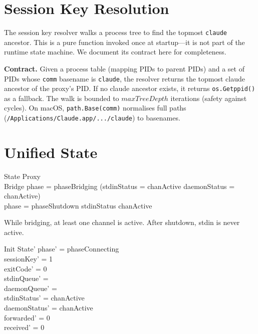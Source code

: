 \documentclass[a4paper,10pt,fleqn]{article}
\begin{document}
\section{Session Key Resolution}

The session key resolver walks a process tree to find the topmost
\texttt{claude} ancestor.  This is a pure function invoked once at
startup---it is not part of the runtime state machine.  We document
its contract here for completeness.

\textbf{Contract.}  Given a process table (mapping PIDs to parent
PIDs) and a set of PIDs whose \texttt{comm} basename is
\texttt{claude}, the resolver returns the topmost claude ancestor
of the proxy's PID.  If no claude ancestor exists, it returns
\texttt{os.Getppid()} as a fallback.  The walk is bounded to
$maxTreeDepth$ iterations (safety against cycles).  On macOS,
\texttt{path.Base(comm)} normalises full paths
(\texttt{/Applications/Claude.app/.../claude}) to basenames.

\section{Unified State}

\begin{schema}{State}
  Proxy \\
  Bridge
  \where
  phase = phaseBridging \implies %
  (stdinStatus = chanActive \lor daemonStatus = chanActive) \\
  phase = phaseShutdown \implies %
  stdinStatus \neq chanActive
\end{schema}

While bridging, at least one channel is active.  After shutdown,
stdin is never active.

\begin{schema}{Init}
  State'
  \where
  phase' = phaseConnecting \\
  sessionKey' = 1 \\
  exitCode' = 0 \\
  stdinQueue' = \langle\rangle \\
  daemonQueue' = \langle\rangle \\
  stdinStatus' = chanActive \\
  daemonStatus' = chanActive \\
  forwarded' = 0 \\
  received' = 0
\end{schema}
\end{document}
